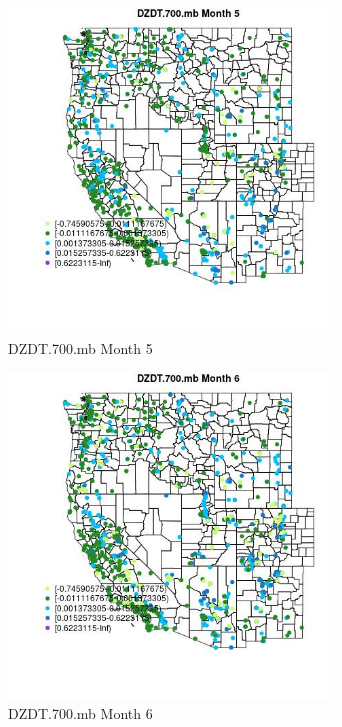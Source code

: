 \begin{figure} 
\centering  
\includegraphics[width=0.77\textwidth]{Code_Outputs/Report_ML_input_PM25_Step4_part_f_de_duplicated_aves_prioritize_24hr_obswNAs_MapObsMo5DZDT700mb.jpg} 
\caption{\label{fig:Report_ML_input_PM25_Step4_part_f_de_duplicated_aves_prioritize_24hr_obswNAsMapObsMo5DZDT700mb}DZDT.700.mb Month 5} 
\end{figure} 
 

\clearpage 

\begin{figure} 
\centering  
\includegraphics[width=0.77\textwidth]{Code_Outputs/Report_ML_input_PM25_Step4_part_f_de_duplicated_aves_prioritize_24hr_obswNAs_MapObsMo6DZDT700mb.jpg} 
\caption{\label{fig:Report_ML_input_PM25_Step4_part_f_de_duplicated_aves_prioritize_24hr_obswNAsMapObsMo6DZDT700mb}DZDT.700.mb Month 6} 
\end{figure} 
 

